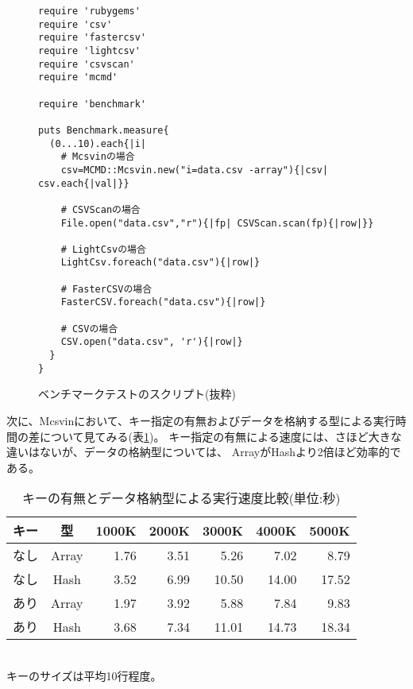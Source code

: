 \begin{figure}[htpb]
\centering
\begin{minipage}{0.8\textwidth}
{\small
\begin{Verbatim}[baselinestretch=0.7,frame=single]
require 'rubygems'
require 'csv'
require 'fastercsv'
require 'lightcsv'
require 'csvscan'
require 'mcmd'

require 'benchmark'

puts Benchmark.measure{
  (0...10).each{|i|
    # Mcsvinの場合
    csv=MCMD::Mcsvin.new("i=data.csv -array"){|csv| csv.each{|val|}}

    # CSVScanの場合
    File.open("data.csv","r"){|fp| CSVScan.scan(fp){|row|}}

    # LightCsvの場合
    LightCsv.foreach("data.csv"){|row|}

    # FasterCSVの場合
    FasterCSV.foreach("data.csv"){|row|}

    # CSVの場合
    CSV.open("data.csv", 'r'){|row|}
  }
}
\end{Verbatim}
}
\end{minipage}
\caption{ベンチマークテストのスクリプト(抜粋)\label{fig:mcsvinRB_script}}
\end{figure}

次に、Mcsvinにおいて、キー指定の有無およびデータを格納する型による実行時間の差について見てみる(表\ref{tb:bench2})。
キー指定の有無による速度には、さほど大きな違いはないが、データの格納型については、
ArrayがHashより2倍ほど効率的である。

\begin{table}[htpb]
\begin{center}
\caption{キーの有無とデータ格納型による実行速度比較(単位:秒)\label{tb:bench2}}
\begin{tabular}{c|c||r|r|r|r|r}
\hline
キー & 型     & 1000K & 2000K& 3000K & 4000K & 5000K\\ \hline\hline
なし & Array  & 1.76  & 3.51 & 5.26  & 7.02  & 8.79 \\
なし & Hash   & 3.52  & 6.99 & 10.50 & 14.00 & 17.52\\
あり & Array  & 1.97  & 3.92 & 5.88  & 7.84  & 9.83 \\
あり & Hash   & 3.68  & 7.34 & 11.01 & 14.73 & 18.34\\
\hline
\end{tabular}  
{\small
\\キーのサイズは平均10行程度。\\
}
\end{center}
\end{table}  

%

